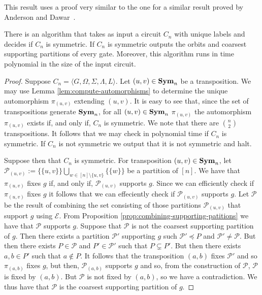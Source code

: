 \documentclass[../paper.tex]{subfiles}
\begin{document}
This result uses a proof very similar to the one for a similar result proved by
Anderson and Dawar~\cite{Anderson17D}.

\begin{lem}
  There is an algorithm that takes as input a circuit $C_n$ with unique labels
  and decides if $C_n$ is symmetric. If $C_n$ is symmetric outputs the orbits
  and coarsest supporting partitions of every gate. Moreover, this algorithm
  runs in time polynomial in the size of the input circuit.
  \label{lem:computing support}
\end{lem}

\begin{proof}
  Suppose $C_n = \langle G, \Omega, \Sigma, \Lambda, L \rangle$. Let $(u, v) \in
  \text{\textbf{Sym}}_n$ be a transposition. We may use Lemma \ref{lem:compute-automorphisms}
  to determine the unique automorphism $\pi_{(u,v)}$ extending $(u, v)$. It is
  easy to see that, since the set of transpositions generate $\text{\textbf{Sym}}_n$, for all
  $(u,v) \in \text{\textbf{Sym}}_n$ $\pi_{(u,v)}$ the automorphism $\pi_{(u,v)}$ exists if, and
  only if, $C_n$ is symmetric. We note that there are ${n}\choose{2}$
  transpositions. It follows that we may check in polynomial time if $C_n$ is
  symmetric. If $C_n$ is not symmetric we output that it is not symmetric and
  halt.

  Suppose then that $C_n$ is symmetric. For transposition $(u, v) \in \text{\textbf{Sym}}_n$,
  let $\mathcal{P}_{(u,v)} := \{\{u,v\}\}\bigcup_{w \in [n] \setminus
    \{u,v\}}\{\{w\}\}$ be a partition of $[n]$. We have that $\pi_{(u,v)}$ fixes
  $g$ if, and only if, $\mathcal{P}_{(u,v)}$ supports $g$. Since we can
  efficiently check if $\pi_{(u,v)}$ fixes $g$ it follows that we can
  effeciently check if $\mathcal{P}_{(u,v)}$ supports $g$. Let $\mathcal{P}$ be
  the result of combining the set consisting of those partitions
  $\mathcal{P}_{(u,v)}$ that support $g$ using $\mathcal{E}$. From Proposition
  \ref{prop:combining-supporting-patitions} we have that $\mathcal{P}$ supports
  $g$. Suppose that $\mathcal{P}$ is not the coarsest supporting partition of
  $g$. Then there exists a partition $\mathcal{P}'$ supporting $g$ such
  $\mathcal{P}' \preceq P$ and $\mathcal{P}' \neq \mathcal{P}$. But then there
  exists $P \in \mathcal{P}$ and $P' \in \mathcal{P}'$ such that $P \subsetneq
  P'$. But then there exists $a , b \in P'$ such that $a \not\in P$. It follows
  that the transposition $(a,b)$ fixes $\mathcal{P}'$ and so $\pi_{(a,b)}$ fixes
  $g$, but then, $\mathcal{P}_{(a,b)}$ supports $g$ and so, from the
  construction of $\mathcal{P}$, $\mathcal{P}$ is fixed by $(a,b)$. But
  $\mathcal{P}$ is not fixed by $(a,b)$, so we have a contradiction. We thus
  have that $\mathcal{P}$ is the coarsest supporting partition of $g$.


\end{proof}
\end{document}
